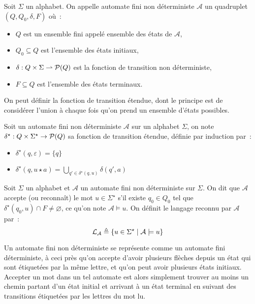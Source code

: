 \begin{definition}
  Soit $\Sigma$ un alphabet. On appelle automate fini non déterministe
  $\mathcal A$ un quadruplet $(Q,Q_0,\delta,F)$ où~:
  \begin{itemize}
  \item $Q$ est un ensemble fini appelé ensemble des états de $\mathcal A$,
  \item $Q_0\subseteq Q$ est l'ensemble des états initiaux,
  \item $\delta : Q\times \Sigma \rightharpoonup \mathcal{P}(Q)$ est la fonction de
    transition non déterministe,
  \item $F\subseteq Q$ est l'ensemble des états terminaux.
  \end{itemize}
\end{definition}

On peut définir la fonction de transition étendue, dont le principe est de
considérer l'union à chaque fois qu'on prend un ensemble d'états possibles.

\begin{definition}
  Soit un automate fini non déterministe $\mathcal A$ sur un alphabet $\Sigma$,
  on note $\delta^\star : Q \times \Sigma^\star \to \mathcal{P}(Q)$ sa fonction de
  transition étendue, définie par induction par~:
  \begin{itemize}
  \item $\delta^\star(q,\varepsilon) = \{q\}$
  \item $\displaystyle\delta^\star(q,u\star a) =
    \bigcup_{q' \in \delta^\star(q,u)} \delta(q',a)$
  \end{itemize}
\end{definition}

\begin{definition}
  Soit $\Sigma$ un alphabet et $\mathcal A$ un automate fini non déterministe
  sur $\Sigma$. On dit que $\mathcal A$ accepte (ou reconnaît) le mot
  $u \in \Sigma^\star$ s'il existe $q_0 \in Q_0$ tel que
  $\delta^\star(q_0,u) \cap F\neq\varnothing$, ce qu'on note
  $\mathcal A \models u$.
  On définit le langage reconnu par $\mathcal A$ par~:
  \[\mathcal L_\mathcal A\triangleq \{u \in \Sigma^\star \mid \mathcal A \models u\}\]
\end{definition}

Un automate fini non déterministe se représente comme un automate fini
déterministe, à ceci près qu'on accepte d'avoir plusieurs flèches depuis un
état qui sont étiquetées par la même lettre, et qu'on peut avoir plusieurs
états initiaux. Accepter un mot dans un tel automate est alors simplement
trouver au moins un chemin partant d'un état initial et arrivant à un état
terminal en suivant des transitions étiquetées par les lettres du mot lu.

